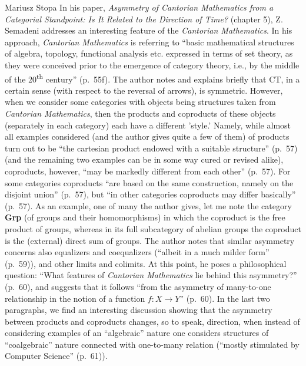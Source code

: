 \begin{recengenv}{Mariusz Stopa}
\enlargethispage{-.5\baselineskip}
In his paper, \textit{Asymmetry of Cantorian Mathematics from a Categorial Standpoint: Is It Related to the Direction of Time?} (chapter 5), Z. Semadeni addresses an interesting feature of the \textit{Cantorian Mathematics}. In his approach, \textit{Cantorian Mathematics} is referring to ``basic mathematical structures of algebra, topology, functional analysis etc. expressed in terms of set theory, as they were conceived prior to the emergence of cat\-e\-go\-ry theory, i.e., by the middle of the 20\textsuperscript{th} century'' (p.~55f). The author notes and explains briefly that CT, in a certain sense (with respect to the reversal of arrows), is symmetric. However, when we consider some cat\-e\-gories with objects being structures taken from \textit{Cantorian Mathematics}, then the products and coproducts of these objects (separately in each cat\-e\-go\-ry) each have a different 'style.' Namely, while almost all examples considered (and the author gives quite a few of them) of products turn out to be ``the cartesian product endowed with a suitable structure'' (p.~57) (and the remaining two examples can be in some way cured or revised alike), coproducts, however, ``may be markedly different from each other'' (p.~57). For some cat\-e\-gories coproducts ``are based on the same construction, namely on the disjoint union'' (p.~57), but ``in other cat\-e\-gories coproducts may differ basically'' (p.~57). As an example, one of many the author gives, let me note the cat\-e\-go\-ry \textbf{Grp} (of groups and their homomorphisms) in which the coproduct is the free product of groups, whereas in its full subcat\-e\-go\-ry of abelian groups the coproduct is the (external) direct sum of groups. The author notes that similar asymmetry concerns also equalizers and coequalizers (``albeit in a much milder form'' (p.~59)), and other limits and colimits. At this point, he poses a philosophical question: ``What features of \textit{Cantorian Mathematics} lie behind this asymmetry?'' (p.~60), and suggests that it follows ``from the asymmetry of many-to-one relationship in the notion of a function $ f:X\to Y $'' (p.~60). In the last two paragraphs, we find an interesting discussion showing that the asymmetry between products and coproducts changes, so to speak, direction, when instead of considering examples of an ``algebraic'' nature one considers structures of ``coalgebraic'' nature connected with one-to-many relation (``mostly stimulated by Computer Science'' (p.~61)).


\end{recengenv}
